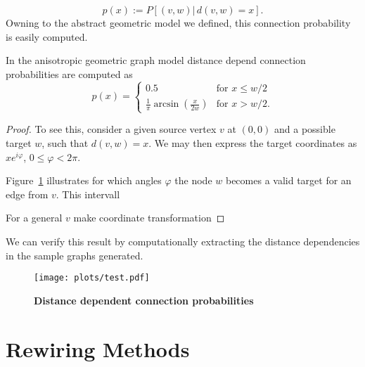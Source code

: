 \[p(x) := P\left[(v,w)|\,d(v,w)=x\right].\]
Owning to the abstract geometric model we defined, this connection
probability is easily computed.

\begin{proposition} %
In the anisotropic geometric graph model distance depend connection
probabilities are computed as 
\[
p(x) = \begin{cases} 0.5 & \mathrm{for} \,\, x\le w/2 \\
                       \frac{1}{\pi}
                       \operatorname{arcsin}(\frac{x}{2w}) &
                       \mathrm{for} \,\, x >
                       w/2. \end{cases}
\]
\end{proposition} 

\begin{proof}
  To see this, consider a given source vertex $v$ at $(0,0)$ and a
  possible target $w$, such that $d(v,w) = x$. We may then express the
  target coordinates as $x e^{i\varphi}$, $0 \le \varphi < 2\pi$.

  Figure~\ref{fig:geomtr_prb} illustrates for which angles
  $\varphi$ the node $w$ becomes a valid target for an edge from
  $v$. This intervall

  \begin{figure}[h] 
    \centering 
    \label{fig:geomtr_prb}
  \end{figure}

  For a general $v$ make coordinate transformation

\end{proof}

We can verify this result by computationally extracting the distance
dependencies in the sample graphs generated. 

\begin{figure}[h]
  \centering
  \texttt{[image: plots/test.pdf]}
  \caption{\textbf{Distance dependent connection probabilities}}%
  \label{fig:distance_theory_compare}%
\end{figure}





\section{Rewiring Methods}

